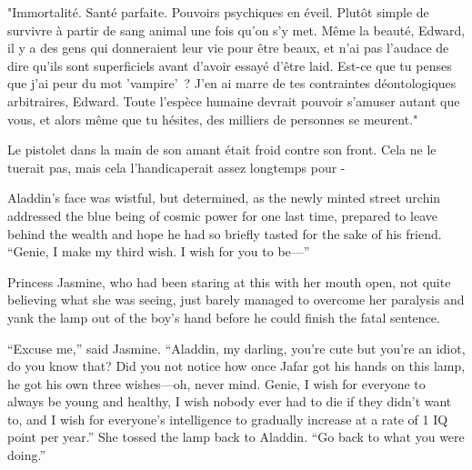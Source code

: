 "Immortalité. Santé parfaite. Pouvoirs psychiques en éveil. Plutôt simple de survivre à partir de sang animal une fois qu'on s'y met. Même la beauté, Edward, il y a des gens qui donneraient leur vie pour être beaux, et n'ai pas l'audace de dire qu'ils sont superficiels avant d'avoir essayé d'être laid. Est-ce que tu penses que j'ai peur du mot 'vampire'~? J'en ai marre de tes contraintes déontologiques arbitraires, Edward. Toute l'espèce humaine devrait pouvoir s'amuser autant que vous, et alors même que tu hésites, des milliers de personnes se meurent."

Le pistolet dans la main de son amant était froid contre son front. Cela ne le tuerait pas, mais cela l'handicaperait assez longtemps pour -


Aladdin’s face was wistful, but determined, as the newly minted street urchin addressed the blue being of cosmic power for one last time, prepared to leave behind the wealth and hope he had so briefly tasted for the sake of his friend. “Genie, I make my third wish. I wish for you to be—”

Princess Jasmine, who had been staring at this with her mouth open, not quite believing what she was seeing, just barely managed to overcome her paralysis and yank the lamp out of the boy’s hand before he could finish the fatal sentence.

“Excuse me,” said Jasmine. “Aladdin, my darling, you’re cute but you’re an idiot, do you know that? Did you not notice how once Jafar got his hands on this lamp, he got his own three wishes—oh, never mind. Genie, I wish for everyone to always be young and healthy, I wish nobody ever had to die if they didn’t want to, and I wish for everyone’s intelligence to gradually increase at a rate of 1 IQ point per year.” She tossed the lamp back to Aladdin. “Go back to what you were doing.”

%
%

